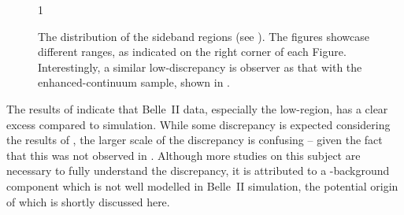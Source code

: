 \begin{figure}[htbp!]
    \centering
    1
    \caption{\label{fig:sidebands_mbc} 
    The \Mbc distribution of the \EB sideband regions (see ).
    The figures showcase different \EB ranges, as indicated on the right corner of each Figure.
    Interestingly, a similar low-\Mbc discrepancy is observer as that with the enhanced-continuum sample, shown in .
    }
\end{figure}

The results of  indicate that Belle~II data, especially the low-\Mbc region, has a clear excess compared to simulation.
While some discrepancy is expected considering the results of ,
the larger scale of the discrepancy is confusing -- given the fact that this was not observed in .
Although more studies on this subject are necessary to fully understand the discrepancy, 
it is attributed to a \BB-background component which is not well modelled in Belle~II simulation, the potential origin of which is shortly discussed here.

